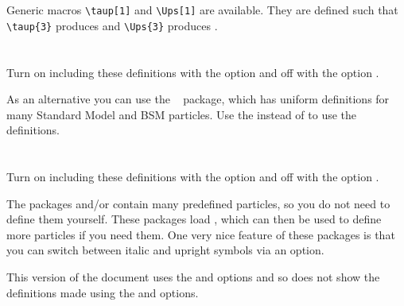 \documentclass[mhchem, UKenglish, texlive=2016]{\ATLASLATEXPATH atlasdoc}
\begin{document}
Generic macros \verb|\taup[1]| and \verb|\Ups[1]| are available.
They are defined such that
\verb|\taup{3}| produces  and
\verb|\Ups{3}| produces .




\newpage
\section{}

Turn on including these definitions with the option  and off with the option .

As an alternative you can use the ~\cite{hepparticles} package,
which has uniform definitions for many Standard Model and BSM particles.
Use the  instead of  to use the  definitions.




\newpage
\section{}

Turn on including these definitions with the option  and off with the option .

The packages  and/or  contain many predefined particles,
so you do not need to define them yourself.
These packages load , which can then be used to define more particles if you need them.
One very nice feature of these packages is that you can switch between italic and upright symbols via an option.

This version of the document uses the  and  options and so
does not show the definitions made using the  and  options.
%







\printbibliography
\end{document}
